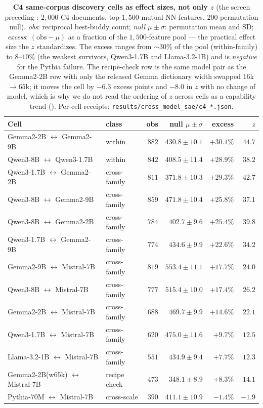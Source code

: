 \begin{table}[h]
\centering
\caption{\textbf{C4 same-corpus discovery cells as effect sizes, not only $z$} (the screen preceding
: $2{,}000$ C4 documents, top-$1{,}500$ mutual-NN features, $200$-permutation
null). \emph{obs}: reciprocal best-buddy count; \emph{null $\mu{\pm}\sigma$}: permutation mean and SD;
\emph{excess}: $(\text{obs}-\mu)$ as a fraction of the $1{,}500$-feature pool --- the practical
effect size the $z$ standardizes. The excess ranges from ${\sim}30\%$ of the pool (within-family)
to $8$--$10\%$ (the weakest survivors, Qwen3-1.7B and Llama-3.2-1B) and is \emph{negative} for the
Pythia failure. The recipe-check row is the same model pair as the Gemma2-2B row with only
the released Gemma dictionary width swapped $16$k$\to$$65$k; it moves the cell by
$-6.3$ excess points and $-8.0$ in $z$ with no change of model, which is why we do not read
the ordering of $z$ across cells as a capability trend
(). Per-cell receipts: \texttt{results/cross\_model\_sae/c4\_*.json}.}
\label{tab:c4_counts}
\footnotesize
\setlength{\tabcolsep}{4pt}
\begin{tabular}{llrrrr}
\toprule
Cell & class & obs & null $\mu{\pm}\sigma$ & excess & $z$ \\
\midrule
Gemma2-2B $\leftrightarrow$ Gemma2-9B & within & $882$ & $430.8{\pm}10.1$ & $+30.1\%$ & $44.7$ \\
Qwen3-8B $\leftrightarrow$ Qwen3-1.7B & within & $842$ & $408.5{\pm}11.4$ & $+28.9\%$ & $38.2$ \\
\midrule
Qwen3-1.7B $\leftrightarrow$ Gemma2-2B & cross-family & $811$ & $371.8{\pm}10.3$ & $+29.3\%$ & $42.7$ \\
Qwen3-8B $\leftrightarrow$ Gemma2-9B & cross-family & $859$ & $471.8{\pm}10.4$ & $+25.8\%$ & $37.1$ \\
Qwen3-8B $\leftrightarrow$ Gemma2-2B & cross-family & $784$ & $402.7{\pm}9.6$ & $+25.4\%$ & $39.8$ \\
Qwen3-1.7B $\leftrightarrow$ Gemma2-9B & cross-family & $774$ & $434.6{\pm}9.9$ & $+22.6\%$ & $34.2$ \\
Gemma2-9B $\leftrightarrow$ Mistral-7B & cross-family & $819$ & $553.4{\pm}11.1$ & $+17.7\%$ & $24.0$ \\
Qwen3-8B $\leftrightarrow$ Mistral-7B & cross-family & $777$ & $515.4{\pm}10.0$ & $+17.4\%$ & $26.2$ \\
Gemma2-2B $\leftrightarrow$ Mistral-7B & cross-family & $688$ & $469.7{\pm}9.9$ & $+14.6\%$ & $22.1$ \\
Qwen3-1.7B $\leftrightarrow$ Mistral-7B & cross-family & $620$ & $475.0{\pm}11.6$ & $+9.7\%$ & $12.5$ \\
Llama-3.2-1B $\leftrightarrow$ Mistral-7B & cross-family & $551$ & $434.9{\pm}9.4$ & $+7.7\%$ & $12.3$ \\
\midrule
Gemma2-2B(w$65$k) $\leftrightarrow$ Mistral-7B & recipe check & $473$ & $348.1{\pm}8.9$ & $+8.3\%$ & $14.1$ \\
Pythia-70M $\leftrightarrow$ Mistral-7B & cross-scale & $390$ & $411.1{\pm}10.9$ & $-1.4\%$ & $-1.9$ \\
\bottomrule
\end{tabular}
\end{table}

